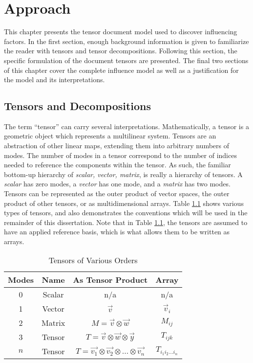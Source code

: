 \documentclass[../dissertation.tex]{subfiles}
\begin{document}
\chapter{Approach}
This chapter presents the tensor document model used to discover
influencing factors.  In the first section, enough background
information is given to familiarize the reader with tensors and tensor
decompositions. Following this section, the specific formulation of
the document tensors are presented.  The final two sections of this
chapter cover the complete influence model as well as a justification
for the model and its interpretations.

\section{Tensors and Decompositions}
The term ``tensor'' can carry several interpretations.
Mathematically, a tensor is a geometric object which represents
a multilinear system.  Tensors are an abstraction of other linear
maps, extending them into arbitrary numbers of modes.  The number of
modes in a tensor correspond to the number of indices needed to
reference the components within the tensor.  As such, the familiar
bottom-up hierarchy of {\em scalar, vector, matrix}, is really 
a hierarchy of tensors.  A {\em scalar} has zero modes, a {\em vector}
has one mode, and a {\em matrix} has two modes.  Tensors can be
represented as the outer product of vector spaces, the outer product
of other tensors, or as multidimensional arrays. Table
\ref{tab:tensor} shows various types of tensors, and also demonstrates
the conventions which will be used in the remainder of this
dissertation.  Note that in Table \ref{tab:tensor}, the tensors are
assumed to have an applied reference basis, which is what allows them
to be written as arrays.  


\begin{table}
    \centering
    \begin{tabular}{c|c|c|c}
        {\bf Modes} & {\bf Name} & {\bf As Tensor Product} & {\bf Array}\\
        \hline
        0 & Scalar & n/a & n/a\\
        1 & Vector & $\vec{v}$ & $\vec{v}_i$\\
        2 & Matrix & $M=\vec{v} \otimes \vec{w}$ & $M_{ij}$\\
        3 & Tensor & $T=\vec{v} \otimes \vec{w} \otimes \vec{y}$ & $T_{ijk}$ \\
        $n$ & Tensor & $T=\vec{v_1} \otimes \vec{v_2} \otimes \ldots \otimes \vec{v_n}$ & $T_{i_1i_2 \ldots i_n}$\\
    \end{tabular}

    \caption{Tensors of Various Orders}
    \label{tab:tensor}
\end{table}
\end{document}
